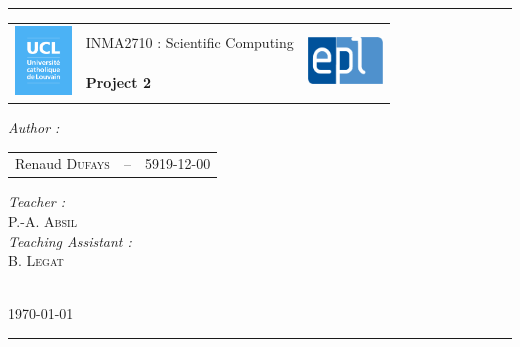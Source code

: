 \thispagestyle{plain}
\hrule
\begin{table}[H]
\begin{tabularx}{\textwidth}{lYr}
 & {\LARGE INMA2710 : Scientific Computing}
&\\[.4cm]
& \Large{\textbf{Project 2}} & \\
\end{tabularx}
\end{table}
\vspace*{.1cm}
\begin{center}
\begin{minipage}{\linewidth}
\begin{multicols}{2}
\begin{flushleft}
\emph{Author :}\\ \vspace*{.1cm}
\hspace*{-.3cm}
\begin{tabular}{lcl}
    \small Renaud \textsc{Dufays} &  -- &  5919-12-00
\end{tabular}         
\end{flushleft}
\columnbreak
\begin{flushright}
\emph{Teacher :}\\ \vspace*{.1cm} 
\small{ P.-A. \textsc{Absil}}\\ \vspace*{.2cm} 
\normalsize \emph{Teaching Assistant :} \\ \vspace*{.1cm} 
\small{ B. \textsc{Legat}}
\end{flushright}
\end{multicols}
\end{minipage}\\[.5cm]
{\large \today}
\end{center}
\hrule